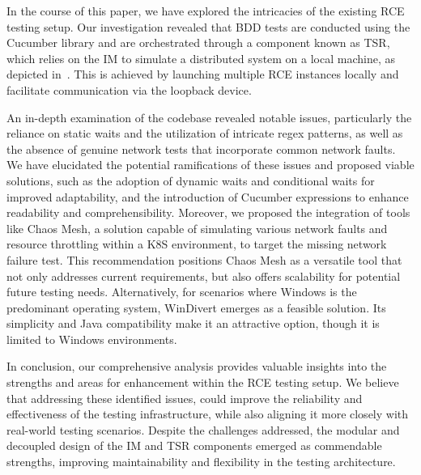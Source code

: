 \label{sec:conclusion}
In the course of this paper, we have explored the intricacies of the existing RCE testing setup. Our investigation revealed that \acf{BDD} tests are conducted using the Cucumber library and are orchestrated through a component known as \acf{TSR}, which relies on the \acf{IM} to simulate a distributed system on a local machine, as depicted in~. This is achieved by launching multiple RCE instances locally and facilitate communication via the loopback device. 

An in-depth examination of the codebase revealed notable issues, particularly the reliance on static waits and the utilization of intricate regex patterns, as well as the absence of genuine network tests that incorporate common network faults. We have elucidated the potential ramifications of these issues and proposed viable solutions, such as the adoption of dynamic waits and conditional waits for improved adaptability, and the introduction of Cucumber expressions to enhance readability and comprehensibility. Moreover, we proposed the integration of tools like Chaos Mesh, a solution capable of simulating various network faults and resource throttling within a \acf{K8S} environment, to target the missing network failure test. This recommendation positions Chaos Mesh as a versatile tool that not only addresses current requirements, but also offers scalability for potential future testing needs. Alternatively, for scenarios where Windows is the predominant operating system, WinDivert emerges as a feasible solution. Its simplicity and Java compatibility make it an attractive option, though it is limited to Windows environments. 

In conclusion, our comprehensive analysis provides valuable insights into the strengths and areas for enhancement within the RCE testing setup. We believe that addressing these identified issues, could improve the reliability and effectiveness of the testing infrastructure, while also aligning it more closely with real-world testing scenarios. Despite the challenges addressed, the modular and decoupled design of the \ac{IM} and \ac{TSR} components emerged as commendable strengths, improving maintainability and flexibility in the testing architecture.
